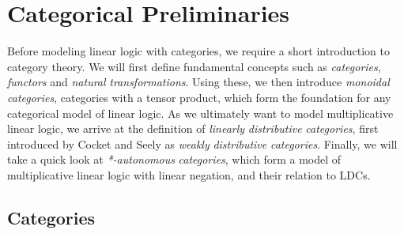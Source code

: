 \documentclass[DIN, pagenumber=false, fontsize=11pt, parskip=half, colorinlistoftodos, svgnames]{scrartcl}
\begin{document}
	
	\section{Categorical Preliminaries}
	\label{sec: catPrel}
	
	Before modeling linear logic with categories, we require a short introduction to category theory. 
	We will first define fundamental concepts such as \emph{categories}, \emph{functors} and \emph{natural} \emph{transformations}. 
	Using these, we then introduce \emph{monoidal} \emph{categories}, categories with a tensor product, which form the foundation for any categorical model of linear logic. 
	As we ultimately want to model multiplicative linear logic, we arrive at the definition of \emph{linearly} \emph{distributive} \emph{categories}, first introduced by Cocket and Seely \cite{cockett&seely97} as \emph{weakly} \emph{distributive} \emph{categories}. 
	Finally, we will take a quick look at \emph{*-autonomous} \emph{categories}, which form a model of multiplicative linear logic with linear negation, and their relation to LDCs.
	
	
	\subsection{Categories}
	\label{subsec: catSec}
	
\end{document}
